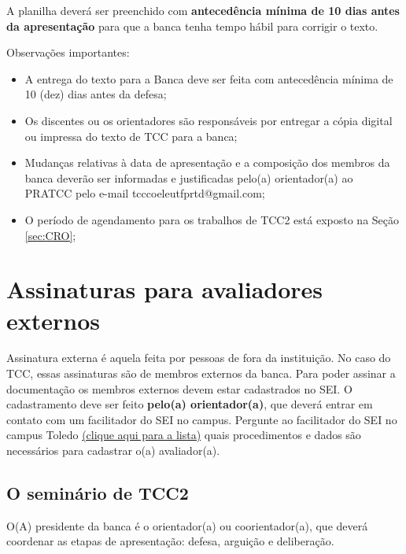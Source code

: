 \documentclass[a4paper, 12pt]{article}
\begin{document}
    A planilha deverá ser preenchido com \textbf{antecedência mínima de 10 dias antes da apresentação} para que a banca tenha tempo hábil para corrigir o texto.    
		
    Observações importantes:
    
    \begin{itemize}
    	\item A entrega do texto para a Banca deve ser feita com antecedência mínima de 10 (dez) dias antes da defesa;
    	\item Os discentes ou os orientadores são responsáveis por entregar a cópia digital ou impressa do texto de TCC para a banca;
    	\item Mudanças relativas à data de apresentação e a composição dos membros da banca deverão ser informadas e justificadas pelo(a) orientador(a) ao PRATCC pelo e-mail tcccoeleutfprtd@gmail.com;
    	\item O período de agendamento para os trabalhos de TCC2 está exposto na Seção \ref{sec:CRO};
    \end{itemize}

	\section{Assinaturas para avaliadores externos}
	
	Assinatura externa é aquela feita por pessoas de fora da instituição. No caso do TCC, essas assinaturas são de membros externos da banca. Para poder assinar a documentação os membros externos devem estar cadastrados no SEI. O cadastramento deve ser feito \textbf{pelo(a) orientador(a)}, que deverá entrar em contato com um facilitador do SEI no campus. Pergunte ao facilitador do SEI no campus Toledo \href{http://portal.utfpr.edu.br/servidores/servicos-servidor/sei/facilitadores}{(clique aqui para a lista)} quais procedimentos e dados são necessários para cadastrar o(a) avaliador(a).

	\subsection{O seminário de TCC2}
	
	O(A) presidente da banca é o orientador(a) ou coorientador(a), que deverá coordenar as etapas de apresentação: defesa, arguição e deliberação. 
	
\end{document}
